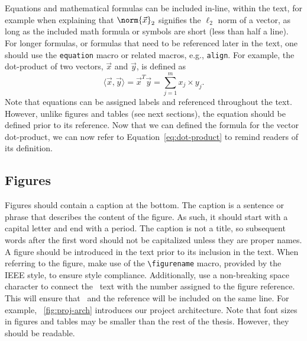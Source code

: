 Equations and mathematical formulas can be included in-line, within the text, for example when explaining that $\norm{\vec x}_2$ signifies the $\ell_2$ norm of a vector, as long as the included math formula or symbols are short (less than half a line). For longer formulas, or formulas that need to be referenced later in the text, one should use the \texttt{equation} macro or related macros, e.g., \texttt{align}. For example, the dot-product of two vectors, $\vec x$ and $\vec y$, is defined as
\begin{equation}\label{eq:dot-product}
    \langle \vec x, \vec y \rangle = \vec{x}^T\vec{y} = \sum_{j=1}^m x_j\times y_j.
\end{equation}
Note that equations can be assigned labels and referenced throughout the text. However, unlike figures and tables (see next sections), the equation should be defined prior to its reference. Now that we can defined the formula for the vector dot-product, we can now refer to Equation~\ref{eq:dot-product} to remind readers of its definition.

\subsection{Figures}\label{sec:latex:figures}

Figures should contain a caption at the bottom. The caption is a sentence or phrase that describes the content of the figure. As such, it should start with a capital letter and end with a period. The caption is not a title, so subsequent words after the first word should not be capitalized unless they are proper names. A figure should be introduced in the text prior to its inclusion in the text. When referring to the figure, make use of the  \texttt{{\textbackslash}figurename} macro, provided by the IEEE style, to ensure style compliance. Additionally, use a non-breaking space character to connect the \figurename~text with the number assigned to the figure reference. This will ensure that \figurename~and the reference will be included on the same line. For example, \figurename~\ref{fig:proj-arch} introduces our project architecture. Note that font sizes in figures and tables may be smaller than the rest of the thesis. However, they should be readable.

